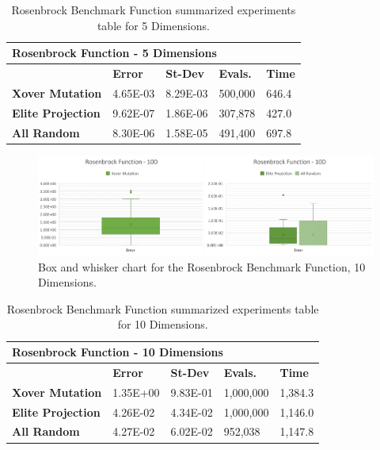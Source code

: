 \documentclass[graybox]{svmult}
\begin{document}
            \begin{table}[]
                \scriptsize
                \centering
                \caption{Rosenbrock Benchmark Function summarized experiments table for 5 Dimensions.}\label{tab.fun_rosenbrock5}
                \begin{tabular}{@{}lllll@{}}
                \toprule
                \multicolumn{5}{l}{\textbf{Rosenbrock Function - 5 Dimensions}} \\ \midrule
                & \textbf{Error} & \textbf{St-Dev} & \textbf{Evals.} & \textbf{Time} \\
                \textbf{Xover Mutation} & 4.65E-03 & 8.29E-03 & 500,000 & 646.4 \\
                \textbf{Elite Projection} & 9.62E-07 & 1.86E-06 & 307,878 & 427.0 \\
                \textbf{All Random} & 8.30E-06 & 1.58E-05 & 491,400 & 697.8 \\ \bottomrule
                \end{tabular}
                \end{table}


            \begin{figure}
                \includegraphics[width=0.99\linewidth, frame]{img/fig_fun_rosenbrock_10d.pdf}
                \caption{Box and whisker chart for the Rosenbrock Benchmark Function, 10 Dimensions.} \label{fig.fun_rosenbrock_10d}
                \end{figure}

            \begin{table}[]
                \scriptsize
                \centering
                \caption{Rosenbrock Benchmark Function summarized experiments table for 10 Dimensions.}\label{tab.fun_rosenbrock10}        
                \begin{tabular}{@{}lllll@{}}
                \toprule
                \multicolumn{5}{l}{\textbf{Rosenbrock Function - 10 Dimensions}} \\ \midrule
                & \textbf{Error} & \textbf{St-Dev} & \textbf{Evals.} & \textbf{Time} \\
                \textbf{Xover Mutation} & 1.35E+00 & 9.83E-01 & 1,000,000 & 1,384.3 \\
                \textbf{Elite Projection} & 4.26E-02 & 4.34E-02 & 1,000,000 & 1,146.0 \\
                \textbf{All Random} & 4.27E-02 & 6.02E-02 & 952,038 & 1,147.8 \\ \bottomrule
                \end{tabular}
                \end{table}
            
\end{document}
